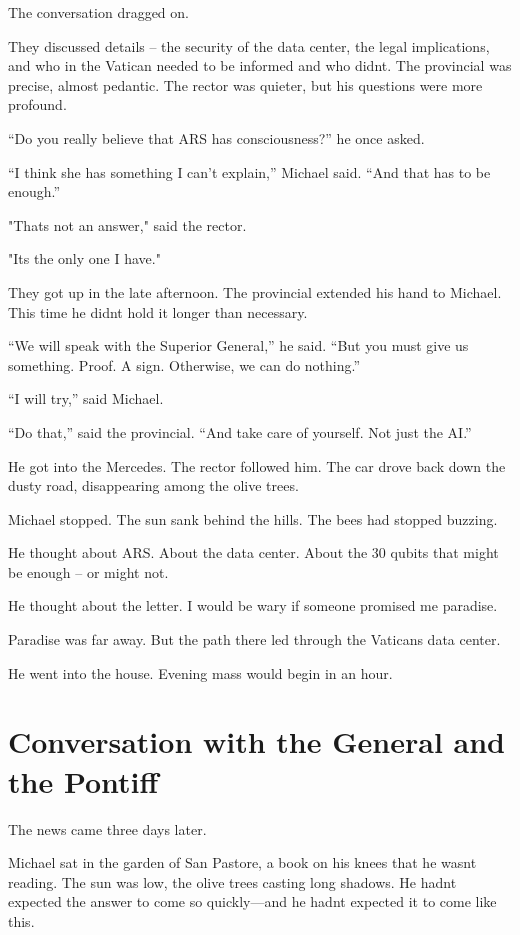 \documentclass[
]{article}
\begin{document}
The conversation dragged on.

They discussed details -- the security of the data center, the legal implications, and who in the Vatican needed to be informed and who didn\textquotesingle t. The provincial was precise, almost pedantic. The rector was quieter, but his questions were more profound.

``Do you really believe that ARS has consciousness?'' he once asked.

``I think she has something I can't explain,'' Michael said. ``And that has to be enough.''

"That\textquotesingle s not an answer," said the rector.

"It\textquotesingle s the only one I have."

They got up in the late afternoon. The provincial extended his hand to Michael. This time he didn\textquotesingle t hold it longer than necessary.

``We will speak with the Superior General,'' he said. ``But you must give us something. Proof. A sign. Otherwise, we can do nothing.''

``I will try,'' said Michael.

``Do that,'' said the provincial. ``And take care of yourself. Not just the AI.''

He got into the Mercedes. The rector followed him. The car drove back down the dusty road, disappearing among the olive trees.

Michael stopped. The sun sank behind the hills. The bees had stopped buzzing.

He thought about ARS. About the data center. About the 30 qubits that might be enough -- or might not.

He thought about the letter. I would be wary if someone promised me paradise.

Paradise was far away. But the path there led through the Vatican\textquotesingle s data center.

He went into the house. Evening mass would begin in an hour.

\section{Conversation with the General and the Pontiff}\label{conversation-with-the-general-and-the-pontiff}

The news came three days later.

Michael sat in the garden of San Pastore, a book on his knees that he wasn\textquotesingle t reading. The sun was low, the olive trees casting long shadows. He hadn\textquotesingle t expected the answer to come so quickly---and he hadn\textquotesingle t expected it to come like this.
\end{document}
